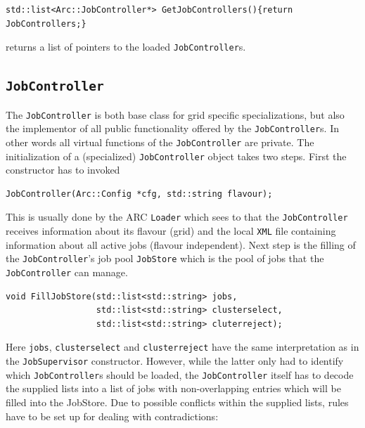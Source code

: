 \documentclass{book}
\newcommand{\JobSupervisor}{\texttt{JobSupervisor}}
\newcommand{\JobController}{\texttt{JobController}}
\newcommand{\XML}{\texttt{XML}}
\newcommand{\Loader}{\texttt{Loader}}
\begin{document}
\begin{shaded}
\begin{verbatim}
std::list<Arc::JobController*> GetJobControllers(){return JobControllers;}
\end{verbatim}
\end{shaded}

returns a list of pointers to the loaded {\JobController}s.

\subsection{{\JobController}} The {\JobController} is both base class for grid specific specializations, but also the implementor of all 
public functionality offered by the {\JobController}s. In other words all virtual functions of the {\JobController} are private. The 
initialization of a (specialized) {\JobController} object takes two steps. First the constructor has to invoked

\begin{shaded}
\begin{verbatim}
JobController(Arc::Config *cfg, std::string flavour);
\end{verbatim}
\end{shaded}

This is usually done by the ARC {\Loader} which sees to that the {\JobController} receives information about its flavour (grid) and 
the local {\XML} file containing information about all active jobs (flavour independent). Next step is the filling of the {\JobController}'s
job pool \texttt{JobStore} which is the pool of jobs that the {\JobController} can manage.

\begin{shaded}
\begin{verbatim}
void FillJobStore(std::list<std::string> jobs,
                  std::list<std::string> clusterselect,
                  std::list<std::string> cluterreject);
\end{verbatim}
\end{shaded}

Here \texttt{jobs}, \texttt{clusterselect} and \texttt{clusterreject} have the same interpretation as in the {\JobSupervisor} constructor. 
However, while the latter only had to identify which {\JobController}s should be loaded, the {\JobController} itself has to decode the 
supplied lists into a list of jobs with non-overlapping entries which will be filled into the JobStore. Due to possible conflicts 
within the supplied lists, rules have to be set up for dealing with contradictions:
\end{document}
